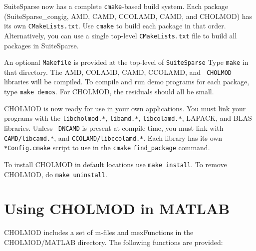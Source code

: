\documentclass[11pt]{article}
\begin{document}
SuiteSparse now has a complete \verb'cmake'-based build system.  Each package
(SuiteSparse\_congig, AMD, CAMD, CCOLAMD, CAMD, and CHOLMOD) has its own
\verb'CMakeLists.txt'.  Use \verb'cmake' to build each package in that order.
Alternatively, you can use a single top-level \verb'CMakeLists.txt' file to
build all packages in SuiteSparse.

An optional \verb'Makefile' is provided at the top-level of \verb'SuiteSparse'
Type {\tt make} in that directory.  The AMD, COLAMD, CAMD, CCOLAMD, and {\tt
CHOLMOD} libraries will be compiled.  To compile and run demo programs for each
package, type \verb'make demos'.  For CHOLMOD, the residuals should all be
small.

CHOLMOD is now ready for use in your own applications.  You must link your
programs with the {\tt libcholmod.*}, {\tt libamd.*}, {\tt libcolamd.*},
LAPACK, and BLAS libraries.  Unless {\tt -DNCAMD} is present at compile time,
you must link with {\tt CAMD/libcamd.*}, and {\tt CCOLAMD/libccolamd.*}.  Each
library has its own \verb'*Config.cmake' script to use in the \verb'cmake'
\verb'find_package' command.

To install CHOLMOD in default locations use {\tt make install}.  To remove
CHOLMOD, do {\tt make uninstall}.

\newpage \section{Using CHOLMOD in MATLAB}

CHOLMOD includes a set of m-files and mexFunctions in the CHOLMOD/MATLAB
directory.  The following functions are provided:
\end{document}
